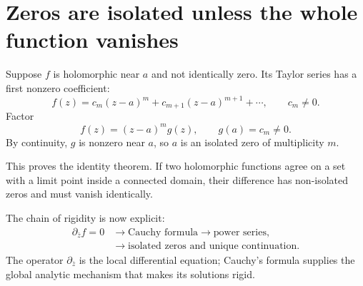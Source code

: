 \section{Zeros are isolated unless the whole function vanishes}

Suppose \(f\) is holomorphic near \(a\) and not identically zero.  Its Taylor series has a first nonzero coefficient:
\[
  f(z)=c_m(z-a)^m+c_{m+1}(z-a)^{m+1}+\cdots,
  \qquad
  c_m\ne0.
\]
Factor
\[
  f(z)=(z-a)^m g(z),
  \qquad
  g(a)=c_m\ne0.
\]
By continuity, \(g\) is nonzero near \(a\), so \(a\) is an isolated zero of multiplicity \(m\).

This proves the identity theorem.  If two holomorphic functions agree on a set with a limit point inside a connected domain, their difference has non-isolated zeros and must vanish identically.

The chain of rigidity is now explicit:
\[
\begin{aligned}
  \partial_{\bar z}f=0
  &\longrightarrow
  \text{Cauchy formula}
  \longrightarrow
  \text{power series},\\
  &\longrightarrow
  \text{isolated zeros and unique continuation}.
\end{aligned}
\]
The operator \(\partial_{\bar z}\) is the local differential equation; Cauchy's formula supplies the global analytic mechanism that makes its solutions rigid.
